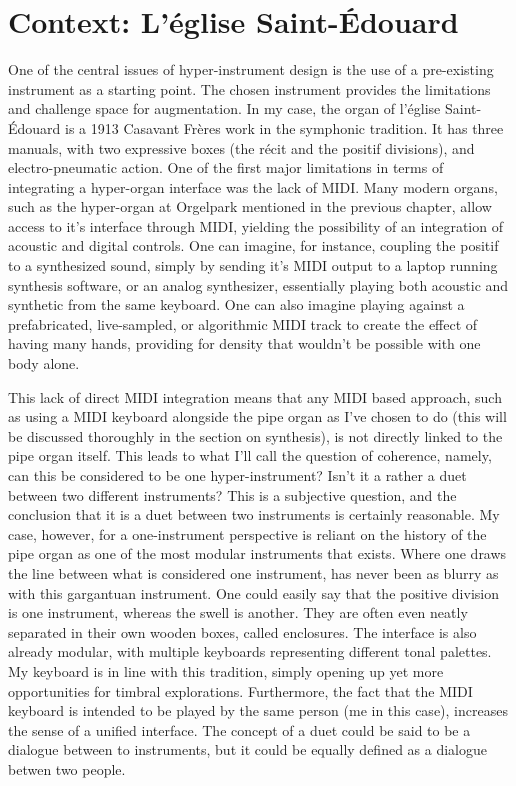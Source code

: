 \documentclass[12pt,twoside,maitrise]{dms_ks}
\theoremstyle{definition}
\begin{document}
\section{Context: L'église Saint-Édouard}

One of the central issues of hyper-instrument design is the use of a pre-existing instrument as a starting point. 
The chosen instrument provides the limitations and challenge space for augmentation. 
In my case, the organ of l'église Saint-Édouard is a 1913 Casavant Frères work in the symphonic tradition. 
It has three manuals, with two expressive boxes (the récit and the positif divisions), and electro-pneumatic action. 
One of the first major limitations in terms of integrating a hyper-organ interface was the lack of MIDI. 
Many modern organs, such as the hyper-organ at Orgelpark mentioned in the previous chapter, allow access to it's interface through MIDI, yielding the possibility of an integration of acoustic and digital controls. 
One can imagine, for instance, coupling the positif to a synthesized sound, simply by sending it's MIDI output to a laptop running synthesis software, or an analog synthesizer, essentially playing both acoustic and synthetic from the same keyboard. 
One can also imagine playing against a prefabricated, live-sampled, or algorithmic MIDI track to create the effect of having many hands, providing for density that wouldn't be possible with one body alone.

This lack of direct MIDI integration means that any MIDI based approach, such as using a MIDI keyboard alongside the pipe organ as I've chosen to do (this will be discussed thoroughly in the section on synthesis), is not directly linked to the pipe organ itself.
This leads to what I'll call the question of coherence, namely, can this be considered to be one hyper-instrument?
Isn't it a rather a duet between two different instruments?
This is a subjective question, and the conclusion that it is a duet between two instruments is certainly reasonable.
My case, however, for a one-instrument perspective is reliant on the history of the pipe organ as one of the most modular instruments that exists.
Where one draws the line between what is considered one instrument, has never been as blurry as with this gargantuan instrument.
One could easily say that the positive division is one instrument, whereas the swell is another.
They are often even neatly separated in their own wooden boxes, called enclosures.
The interface is also already modular, with multiple keyboards representing different tonal palettes.
My keyboard is in line with this tradition, simply opening up yet more opportunities for timbral explorations.
Furthermore, the fact that the MIDI keyboard is intended to be played by the same person (me in this case), increases the sense of a unified interface.
The concept of a duet could be said to be a dialogue between to instruments, but it could be equally defined as a dialogue betwen two people.
\end{document}
